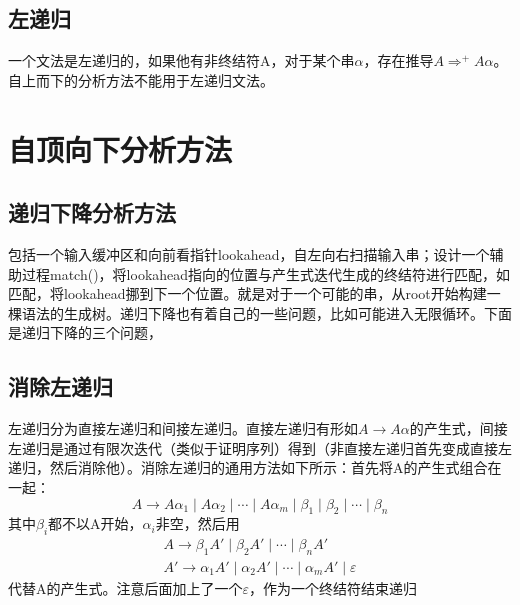 \documentclass[]{report}
\begin{document}
		\subsection{左递归}
		一个文法是左递归的，如果他有非终结符A，对于某个串$\alpha$，存在推导$A\Rightarrow^+A\alpha$。自上而下的分析方法不能用于左递归文法。
	\section{自顶向下分析方法}
		\subsection{递归下降分析方法}\label{subsection:Recursive_Descent}
		包括一个输入缓冲区和向前看指针lookahead，自左向右扫描输入串；设计一个辅助过程match()，将lookahead指向的位置与产生式迭代生成的终结符进行匹配，如匹配，将lookahead挪到下一个位置。就是对于一个可能的串，从root开始构建一棵语法的生成树。递归下降也有着自己的一些问题，比如可能进入无限循环。下面是递归下降的三个问题，
		\subsection{消除左递归}\label{subsection:Eliminating_Left_Recursion}
		左递归分为直接左递归和间接左递归。直接左递归有形如$A\rightarrow A\alpha$的产生式，间接左递归是通过有限次迭代（类似于证明序列）得到（非直接左递归首先变成直接左递归，然后消除他）。消除左递归的通用方法如下所示：首先将A的产生式组合在一起：
		\[A\to A\alpha_1\mid A\alpha_2\mid\cdots\mid A\alpha_m\mid\beta_1\mid\beta_2\mid\cdots\mid\beta_n\]
		其中$\beta_i$都不以A开始，$\alpha_i$非空，然后用
		\[\begin{gathered}
			A\to\beta_1A'\mid\beta_2A'\mid\cdots\mid\beta_nA'\\
			A'\to\alpha_1A'\mid\alpha_2A'\mid\cdots\mid\alpha_mA'\mid\varepsilon
		\end{gathered}\]
		代替A的产生式。注意后面加上了一个$\varepsilon$，作为一个终结符结束递归
\end{document}
